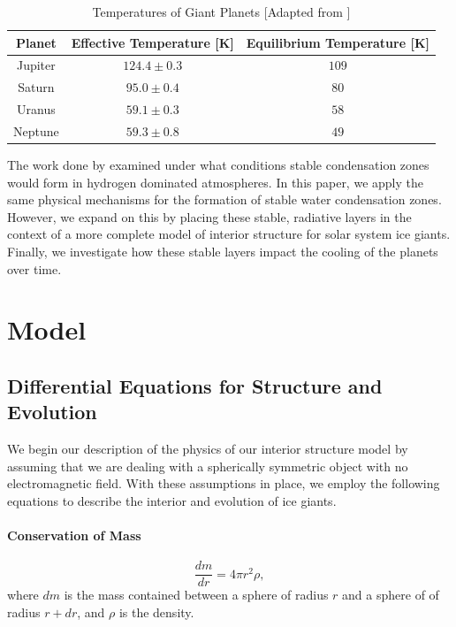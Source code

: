 \documentclass[11pt]{ucscthesisbs}
\begin{document}
\begin{table}[]
\centering
\begin{tabular}{ccc}
Planet                        & Effective Temperature [K]            & Equilibrium Temperature [K] \\ \hline
\multicolumn{1}{|c|}{Jupiter} & \multicolumn{1}{c|}{$124.4 \pm 0.3$} & \multicolumn{1}{c|}{$109$}  \\ \hline
\multicolumn{1}{|c|}{Saturn}  & \multicolumn{1}{c|}{$95.0 \pm 0.4$}  & \multicolumn{1}{c|}{$80$}   \\ \hline
\multicolumn{1}{|c|}{Uranus}  & \multicolumn{1}{c|}{$59.1 \pm 0.3$}  & \multicolumn{1}{c|}{$58$}   \\ \hline
\multicolumn{1}{|c|}{Neptune} & \multicolumn{1}{c|}{$59.3 \pm 0.8$}  & \multicolumn{1}{c|}{$49$}   \\ \hline
\end{tabular}
\caption{Temperatures of Giant Planets [Adapted from \citep{seager_2010}]}
\label{tab:planetary_temperatures}
\end{table}


The work done by \citep{guillot_1995,friedson_2017,leconte_2017} examined under what conditions stable condensation zones would form in hydrogen dominated atmospheres. In this paper, we apply the same physical mechanisms for the formation of stable water condensation zones. However, we expand on this by placing these stable, radiative layers in the context of a more complete model of interior structure for solar system ice giants. Finally, we investigate how these stable layers impact the cooling of the planets over time. 


\chapter{Model}

\section{Differential Equations for Structure and Evolution}
\label{Three-layer Model with Dry Adiabat}
We begin our description of the physics of our interior structure model by assuming that we are dealing with a spherically symmetric object with no electromagnetic field.  With these assumptions in place, we employ the following equations to describe the interior and evolution of ice giants.
\subsubsection{Conservation of Mass}
\begin{equation}
  \frac{dm}{dr} =4 \pi r^{2}\rho  ,
\end{equation}
where $dm$ is the mass contained between a sphere of radius $r$ and a sphere of of radius $r + dr$, and $\rho$ is the density. 
\end{document}
